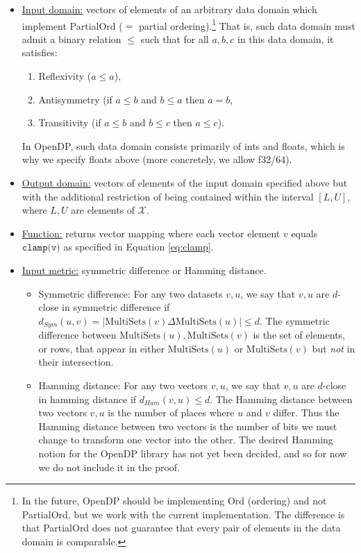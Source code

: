 \documentclass[11pt,a4paper]{article}
\theoremstyle{definition}
\newcommand{\X}{\mathcal{X}}
\begin{document}
\begin{itemize}
    \item \underline{Input domain:} vectors of elements of an arbitrary data domain which implement PartialOrd ($=$ partial ordering).\footnote{In the future, OpenDP should be implementing Ord (ordering) and not PartialOrd, but we work with the current implementation. The difference is that PartialOrd does not guarantee that every pair of elements in the data domain is comparable.} That is, such data domain must admit a binary relation $\leq$ such that for all $a, b, c$ in this data domain, it satisfies:
    \begin{enumerate}
        \item Reflexivity ($a \leq a$),
        \item Antisymmetry (if $a \leq b$ and $b \leq a$ then $a=b$,
        \item Transitivity (if $a \leq b$ and $b \leq c$ then $a \leq c$).
    \end{enumerate}
    In OpenDP, such data domain consists primarily of ints and floats, which is why we specify floats above (more concretely, we allow f32/64).
    \item \underline{Output domain:} vectors of elements of the input domain specified above but with the additional restriction of being contained within the interval $[L, U]$, where $L, U$ are elements of $\X$.
    \item \underline{Function:} returns vector mapping where each vector element $v$ equals $\texttt{clamp(v)}$ as specified in Equation \eqref{eq:clamp}.
    \item \underline{Input metric:} symmetric difference or Hamming distance. 
    \begin{itemize}
        \item Symmetric difference: For any two datasets $v, u$, we say that $v, u$ are $d$-close in symmetric difference if $d_{Sym}(u, v) = |\textrm{MultiSets}(v) \Delta \textrm{MultiSets}(u)| \leq d$. The symmetric difference between $\textrm{MultiSets}(u), \textrm{MultiSets}(v)$ is the set of elements, or rows, that appear in either $\textrm{MultiSets}(u)$ or $\textrm{MultiSets}(v)$ but \textit{not} in their intersection. 
        \item Hamming distance: For any two vectors $v, u$, we say that $v, u$ are $d$-close in hamming distance if $d_{Ham}(v, u) \leq d$. The Hamming distance between two vectors $v, u$ is the number of places where $u$ and $v$ differ. Thus the Hamming distance between two vectors is the number of bits we must change to transform one vector into the other. The desired Hamming notion for the OpenDP library has not yet been decided, and so for now we do not include it in the proof.
    \end{itemize}
    

\end{itemize}
\end{document}
